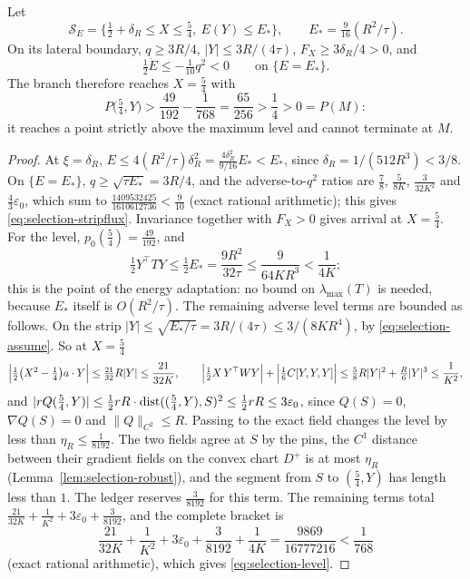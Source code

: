 \begin{lemma}\label{lem:selection-strip}
Let
\[
\mathcal S_E=\bigl\{\tfrac12+\delta_R\le X\le\tfrac54,\ E(Y)\le E_*\bigr\},\qquad E_*=\tfrac9{16}(R^2/\tau).
\]
On its lateral boundary, $q\ge3R/4$, $|Y|\le3R/(4\tau)$, $F_X\ge3\delta_R/4>0$, and
\begin{equation}\label{eq:selection-stripflux}
\tfrac12\dot E\le-\tfrac1{10}q^2<0\qquad\text{on }\{E=E_*\}.
\end{equation}
The branch therefore reaches $X=\frac54$ with
\begin{equation}\label{eq:selection-level}
P\bigl(\tfrac54,Y\bigr)>\frac{49}{192}-\frac1{768}=\frac{65}{256}>\frac14>0=P(M):
\end{equation}
it reaches a point strictly above the maximum level and cannot terminate at $M$.
\end{lemma}

\begin{proof}
At $\xi=\delta_R$, $E\le4(R^2/\tau)\delta_R^2=\frac{4\delta_R^2}{9/16}E_*<E_*$, since $\delta_R=1/(512R^3)<3/8$. On $\{E=E_*\}$, $q\ge\sqrt{\tau E_*}=3R/4$, and the adverse-to-$q^2$ ratios are $\frac78$, $\frac5{8K}$, $\frac3{32K^2}$ and $\frac43\varepsilon_0$, which sum to $\frac{1409532425}{1610612736}<\frac9{10}$ (exact rational arithmetic); this gives \eqref{eq:selection-stripflux}. Invariance together with $F_X>0$ gives arrival at $X=\frac54$. For the level, $p_0(\frac54)=\frac{49}{192}$, and
\[
\tfrac12Y^{\top}TY\le\tfrac12E_*=\frac{9R^2}{32\tau}\le\frac9{64KR^3}<\frac1{4K};
\]
this is the point of the energy adaptation: no bound on $\lambda_{\max}(T)$ is needed, because $E_*$ itself is $O(R^2/\tau)$. The remaining adverse level terms are bounded as follows. On the strip $|Y|\le\sqrt{E_*/\tau}=3R/(4\tau)\le3/(8KR^4)$, by \eqref{eq:selection-assume}. So at $X=\frac54$
\[
\Bigl|\tfrac12\bigl(X^2-\tfrac14\bigr)a\cdot Y\Bigr|\le\tfrac{21}{32}R|Y|\le\frac{21}{32K},\qquad
\Bigl|\tfrac12X\,Y^{\top}WY\Bigr|+\Bigl|\tfrac16C[Y,Y,Y]\Bigr|\le\tfrac58R|Y|^2+\tfrac R6|Y|^3\le\frac1{K^2},
\]
and $|rQ(\frac54,Y)|\le\frac12rR\cdot\operatorname{dist}((\frac54,Y),S)^2\le\frac12rR\le3\varepsilon_0$, since $Q(S)=0$, $\nabla Q(S)=0$ and $\|Q\|_{C^2}\le R$. Passing to the exact field changes the level by less than $\eta_R\le\frac1{8192}$. The two fields agree at $S$ by the pins, the $C^1$ distance between their gradient fields on the convex chart $D^+$ is at most $\eta_R$ (Lemma~\ref{lem:selection-robust}), and the segment from $S$ to $(\frac54,Y)$ has length less than $1$. The ledger reserves $\frac3{8192}$ for this term. The remaining terms total $\frac{21}{32K}+\frac1{K^2}+3\varepsilon_0+\frac3{8192}$, and the complete bracket is
\[
\frac{21}{32K}+\frac1{K^2}+3\varepsilon_0+\frac3{8192}+\frac1{4K}=\frac{9869}{16777216}<\frac1{768}
\]
(exact rational arithmetic), which gives \eqref{eq:selection-level}.
\end{proof}

